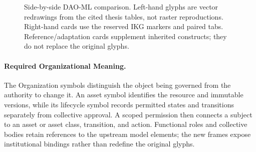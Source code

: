 \documentclass[journal]{IEEEtran}
\begin{document}
\begin{figure}[t]
\caption{Side-by-side DAO-ML comparison. Left-hand glyphs are vector redrawings from the cited thesis tables, not raster reproductions. Right-hand cards use the reserved IKG markers and paired tabs. Reference/adaptation cards supplement inherited constructs; they do not replace the original glyphs.}
\label{fig:dao_notation_comparison}
\end{figure}

\paragraph{Required Organizational Meaning.}
The Organization symbols distinguish the object being governed from
the authority to change it. An asset symbol identifies the resource and
immutable versions, while its lifecycle symbol records permitted states
and transitions separately from collective approval. A scoped permission
then connects a subject to an asset or asset class, transition, and action.
Functional roles and collective bodies retain references to the upstream
model elements; the new frames expose institutional bindings rather than
redefine the original glyphs.
\end{document}
